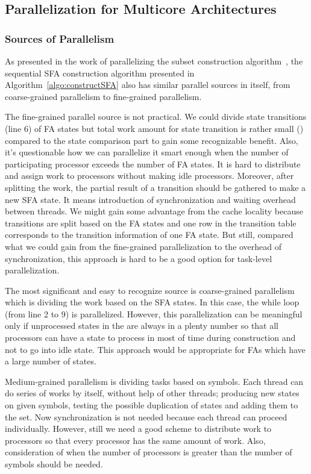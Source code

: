 \documentclass[10pt, conference, compsocconf]{IEEEtran}
\begin{document}
\subsection{Parallelization for Multicore Architectures}
\label{sec:parallelOnMulti}

\subsubsection{Sources of Parallelism}
\label{subsubsec:parSources}
As presented in the work of parallelizing the subset
construction algorithm~\cite{Choi2013}, the sequential SFA construction
algorithm presented in Algorithm~\ref{algo:constructSFA} also has
similar parallel sources in itself, from coarse-grained parallelism to
fine-grained parallelism.

The fine-grained parallel source is not practical. We could
divide state transitions (line 6) of FA states but total work amount
for state transition is rather small ()
compared to the state comparison part to gain some recognizable benefit. Also, it's questionable
how we can parallelize it smart enough when the number of participating
processor exceeds the number of FA states. It is hard to distribute and
assign work to processors without making idle processors. Moreover,
after splitting the work, the partial result of a transition should be gathered
to make a new SFA state. It means introduction of synchronization and waiting overhead between
threads. We might gain some advantage from the cache locality
because transitions are split based on the FA states and one row in the transition
table  corresponds to the transition information of one FA state.
But still, compared what we could gain from the fine-grained parallelization
to the overhead of synchronization, this approach is hard to be a good option
for task-level parallelization.

The most significant and easy to recognize source is coarse-grained
parallelism which is dividing the work based on the SFA states. In
this case, the while loop (from line 2 to 9) is parallelized. However,
this parallelization can be meaningful only if unprocessed states in
the  are always in a plenty number so that all processors
can have a state to process in most of time during construction and not to
go into idle state. This approach would be appropriate for FAs which have a large number of states.

Medium-grained parallelism is dividing tasks based on symbols.
Each thread can do series of works by itself, without help of other threads;
producing new states on given symbols, testing the possible duplication of states 
and adding them to the set. 
Now synchronization is not needed because each thread can proceed individually.
However, still we need a good scheme to distribute work to processors
so that every processor has the same amount of work. Also, consideration of when 
the number of processors is greater than the number of symbols should be needed.
\end{document}
